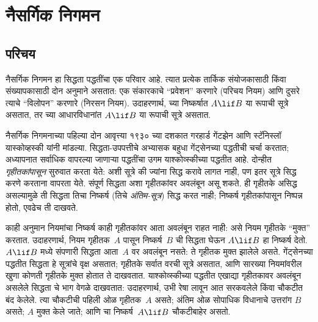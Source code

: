 \chapter{नैसर्गिक निगमन}\label{pt:nat:chap}









\section{परिचय}\label{pt:nat:int:sec}

नैसर्गिक निगमन हा सिद्धता
पद्धतींचा एक परिवार आहे.
त्यात प्रत्येक तार्किक संयोजकासाठी
किंवा संख्यापकासाठी दोन
अनुमाने असतात: एक संकारकाचे
“प्रवेशन” करणारे
(परिचय नियम)
आणि दुसरे त्याचे “विलोपन”
करणारे (निरसन नियम).
उदाहरणार्थ, \Intro{\lif}
च्या निष्कर्षात
$A \lif B$ या रूपाची
सूत्रे असतात,
तर \Elim{\lif} च्या
आधारविधानांत
$A \lif B$ या रूपाची
सूत्रे असतात.

नैसर्गिक निगमनाच्या
पहिल्या दोन आवृत्त्या
१९३० च्या दशकात गरहार्ड
गेंटझेन आणि स्टॅनिस्लॉ
यास्कोव्हस्की यांनी मांडल्या.
सिद्धता-उपपत्तीचे अभ्यासक
बहुधा गेंट्सेनच्या पद्धतीची
चर्चा करतात; अध्यापनात
सर्वाधिक वापरल्या जाणाऱ्या
पद्धतींचा उगम याश्कोव्स्कीच्या
पद्धतीत आहे. दोन्हीत
\emph{गृहीतकांपासून} सुरुवात
करता येते: अशी सूत्रे
की ज्यांना सिद्ध करावे
लागत नाही, पण इतर
सूत्रे सिद्ध करणे
करताना वापरता येते.
संपूर्ण सिद्धता अशा
गृहीतकांवर अवलंबून असू शकते.
ही गृहीतके असिद्ध असल्यामुळे
ती सिद्धता तिचा निष्कर्ष
(तिचे \emph{अंतिम-सूत्र})
सिद्ध करत नाही; निष्कर्ष
गृहीतकांपासून निष्पन्न होतो,
एवढेच ती दाखवते.

काही अनुमान नियमांचा
निष्कर्ष काही गृहीतकांवर
आता अवलंबून राहत नाही:
असे नियम गृहीतके “मुक्त”
करतात. उदाहरणार्थ,
\Intro{\lif} नियम
गृहीतक~$A$ पासून
निष्कर्ष~$B$ ची
सिद्धता घेऊन
$A \lif B$ हा
निष्कर्ष देतो.
$A \lif B$ मध्ये
संपणारी सिद्धता
आता~$A$ वर अवलंबून
नसते: ते गृहीतक
मुक्त झालेले असते.
गेंट्सेनच्या पद्धतीत
सिद्धता हे
सूत्रांचे वृक्ष
असतात; गृहीतके सर्वात
वरची सूत्रे असतात,
आणि \Intro{\lif}
सारख्या नियमांवरील खुणा
कोणती गृहीतके मुक्त होतात
ते दाखवतात.
याश्कोव्स्कीच्या पद्धतीत
एखाद्या गृहीतकावर अवलंबून
असलेले सिद्धता चे भाग
वेगळे दाखवतात: उदाहरणार्थ,
उभी रेषा लावून आत सरकवलेले
किंवा चौकटीत बंद केलेले.
त्या चौकटीची पहिली ओळ
गृहीतक~$A$ असते;
अंतिम ओळ सोपाधिक विधानाचे
उत्तरांग $B$ असते;
$A$ मुक्त केले जाते;
आणि \Intro{\lif} चा
निष्कर्ष~$A \lif B$
चौकटीबाहेर असतो.

